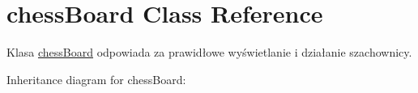 \hypertarget{classchessBoard}{}\section{chess\+Board Class Reference}
\label{classchessBoard}


Klasa \hyperlink{classchessBoard}{chess\+Board} odpowiada za prawidłowe wyświetlanie i działanie szachownicy.  




Inheritance diagram for chess\+Board\+:
